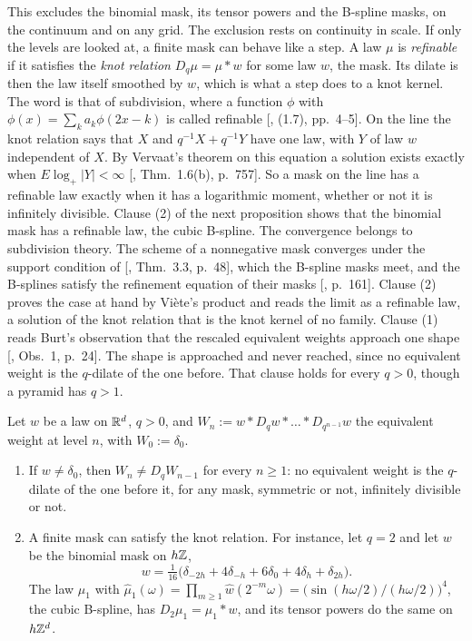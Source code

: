 This excludes the binomial mask, its tensor powers and the B-spline masks, on the continuum and on
any grid. The exclusion rests on continuity in scale. If only the levels are looked at, a finite
mask can behave like a step. A law $\mu$ is \emph{refinable} if it satisfies the \emph{knot
relation} $D_q\mu = \mu * w$ for some law $w$, the mask. Its dilate is then the law itself smoothed
by $w$, which is what a step does to a knot kernel. The word is that of subdivision, where a
function $\phi$ with $\phi(x) = \sum_k a_k\phi(2x - k)$ is called refinable
[, (1.7), pp.~4--5].
On the line the knot relation says that $X$ and $q^{-1}X + q^{-1}Y$ have one law, with $Y$ of law $w$
independent of $X$. By Vervaat's theorem on this equation a solution exists exactly when
$E\log_+|Y| < \infty$ [, Thm.~1.6(b), p.~757]. So a mask on the line
has a refinable law exactly when it has a logarithmic moment, whether or not it is infinitely
divisible.
Clause (2) of the next proposition shows that the binomial mask has a refinable law, the cubic
B-spline. The convergence belongs to subdivision theory. The scheme of a nonnegative mask converges
under the support condition of [, Thm.~3.3, p.~48], which the
B-spline masks meet, and the B-splines satisfy the refinement equation of their masks
[, p.~161]. Clause (2) proves the case at
hand by Vi\`ete's product and reads the limit as a refinable law, a solution of the knot relation
that is the knot kernel of no family. Clause (1) reads Burt's observation that the rescaled equivalent weights approach one
shape [, Obs.~1, p.~24]. The shape is approached and never reached, since no
equivalent weight is the $q$-dilate of the one before. That clause holds for every $q > 0$, though
a pyramid has $q > 1$.

\begin{proposition}
\label{prop:equivalent-weights}

Let $w$ be a law on $\mathbb{R}^d$, $q > 0$, and $W_n := w * D_qw * \dots * D_{q^{n-1}}w$ the equivalent
weight at level $n$, with $W_0 := \delta_0$.
\begin{enumerate}
\item If $w \ne \delta_0$, then $W_n \ne D_qW_{n-1}$ for every $n \ge 1$: no equivalent weight is the
$q$-dilate of the one before it, for any mask, symmetric or not, infinitely divisible or not.
\item A finite mask can satisfy the knot relation. For instance, let $q = 2$ and let $w$ be the
binomial mask on $h\mathbb{Z}$,
\[
  w = \tfrac1{16}\bigl(\delta_{-2h} + 4\delta_{-h} + 6\delta_0 + 4\delta_h + \delta_{2h}\bigr).
\]
The law $\mu_1$ with
$\widehat\mu_1(\omega) = \prod_{m \ge 1}\widehat w(2^{-m}\omega) = \bigl(\sin(h\omega/2)/(h\omega/2)\bigr)^4$,
the cubic B-spline, has $D_2\mu_1 = \mu_1 * w$, and its tensor powers do the same on $h\mathbb{Z}^d$.
\end{enumerate}
\end{proposition}


